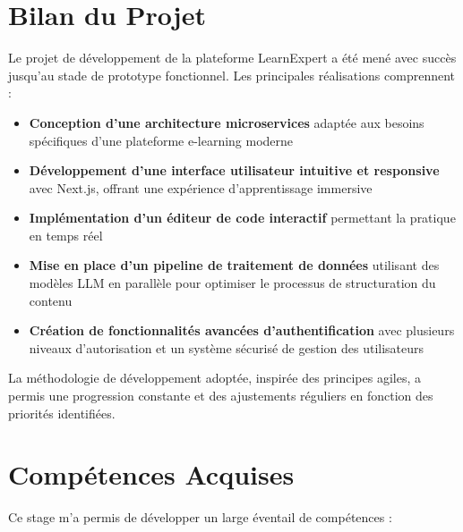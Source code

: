 \documentclass[12pt, a4paper]{report}
\begin{document}
\section{Bilan du Projet}

Le projet de développement de la plateforme LearnExpert a été mené avec succès jusqu'au stade de prototype fonctionnel. Les principales réalisations comprennent :

\begin{itemize}
  \item \textbf{Conception d'une architecture microservices} adaptée aux besoins spécifiques d'une plateforme e-learning moderne
  \item \textbf{Développement d'une interface utilisateur intuitive et responsive} avec Next.js, offrant une expérience d'apprentissage immersive
  \item \textbf{Implémentation d'un éditeur de code interactif} permettant la pratique en temps réel
  \item \textbf{Mise en place d'un pipeline de traitement de données} utilisant des modèles LLM en parallèle pour optimiser le processus de structuration du contenu
  \item \textbf{Création de fonctionnalités avancées d'authentification} avec plusieurs niveaux d'autorisation et un système sécurisé de gestion des utilisateurs
\end{itemize}

La méthodologie de développement adoptée, inspirée des principes agiles, a permis une progression constante et des ajustements réguliers en fonction des priorités identifiées.

\section{Compétences Acquises}

Ce stage m'a permis de développer un large éventail de compétences :
\end{document}

